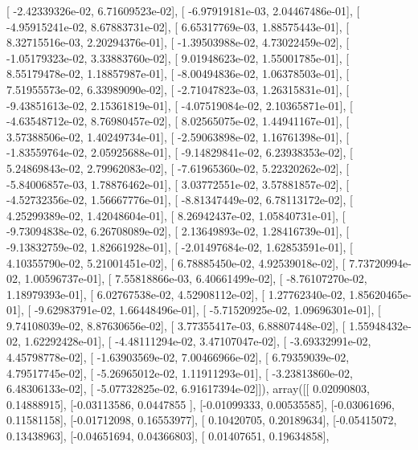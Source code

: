 \documentclass{article}
\begin{document}
       [ -2.42339326e-02,   6.71609523e-02],
       [ -6.97919181e-03,   2.04467486e-01],
       [ -4.95915241e-02,   8.67883731e-02],
       [  6.65317769e-03,   1.88575443e-01],
       [  8.32715516e-03,   2.20294376e-01],
       [ -1.39503988e-02,   4.73022459e-02],
       [ -1.05179323e-02,   3.33883760e-02],
       [  9.01948623e-02,   1.55001785e-01],
       [  8.55179478e-02,   1.18857987e-01],
       [ -8.00494836e-02,   1.06378503e-01],
       [  7.51955573e-02,   6.33989090e-02],
       [ -2.71047823e-03,   1.26315831e-01],
       [ -9.43851613e-02,   2.15361819e-01],
       [ -4.07519084e-02,   2.10365871e-01],
       [ -4.63548712e-02,   8.76980457e-02],
       [  8.02565075e-02,   1.44941167e-01],
       [  3.57388506e-02,   1.40249734e-01],
       [ -2.59063898e-02,   1.16761398e-01],
       [ -1.83559764e-02,   2.05925688e-01],
       [ -9.14829841e-02,   6.23938353e-02],
       [  5.24869843e-02,   2.79962083e-02],
       [ -7.61965360e-02,   5.22320262e-02],
       [ -5.84006857e-03,   1.78876462e-01],
       [  3.03772551e-02,   3.57881857e-02],
       [ -4.52732356e-02,   1.56667776e-01],
       [ -8.81347449e-02,   6.78113172e-02],
       [  4.25299389e-02,   1.42048604e-01],
       [  8.26942437e-02,   1.05840731e-01],
       [ -9.73094838e-02,   6.26708089e-02],
       [  2.13649893e-02,   1.28416739e-01],
       [ -9.13832759e-02,   1.82661928e-01],
       [ -2.01497684e-02,   1.62853591e-01],
       [  4.10355790e-02,   5.21001451e-02],
       [  6.78885450e-02,   4.92539018e-02],
       [  7.73720994e-02,   1.00596737e-01],
       [  7.55818866e-03,   6.40661499e-02],
       [ -8.76107270e-02,   1.18979393e-01],
       [  6.02767538e-02,   4.52908112e-02],
       [  1.27762340e-02,   1.85620465e-01],
       [ -9.62983791e-02,   1.66448496e-01],
       [ -5.71520925e-02,   1.09696301e-01],
       [  9.74108039e-02,   8.87630656e-02],
       [  3.77355417e-03,   6.88807448e-02],
       [  1.55948432e-02,   1.62292428e-01],
       [ -4.48111294e-02,   3.47107047e-02],
       [ -3.69332991e-02,   4.45798778e-02],
       [ -1.63903569e-02,   7.00466966e-02],
       [  6.79359039e-02,   4.79517745e-02],
       [ -5.26965012e-02,   1.11911293e-01],
       [ -3.23813860e-02,   6.48306133e-02],
       [ -5.07732825e-02,   6.91617394e-02]]), array([[ 0.02090803,  0.14888915],
       [-0.03113586,  0.0447855 ],
       [-0.01099333,  0.00535585],
       [-0.03061696,  0.11581158],
       [-0.01712098,  0.16553977],
       [ 0.10420705,  0.20189634],
       [-0.05415072,  0.13438963],
       [-0.04651694,  0.04366803],
       [ 0.01407651,  0.19634858],
\end{document}
